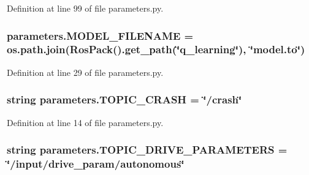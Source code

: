 Definition at line 99 of file parameters.\+py.

\subsubsection[{\texorpdfstring{M\+O\+D\+E\+L\+\_\+\+F\+I\+L\+E\+N\+A\+ME}{MODEL_FILENAME}}]{\setlength{\rightskip}{0pt plus 5cm}parameters.\+M\+O\+D\+E\+L\+\_\+\+F\+I\+L\+E\+N\+A\+ME = os.\+path.\+join(Ros\+Pack().get\+\_\+path(\char`\"{}q\+\_\+learning\char`\"{}), \char`\"{}model.\+to\char`\"{})}\hypertarget{namespaceparameters_aff8b0668384f3fa2d1212d3bd0ff42fa}{}\label{namespaceparameters_aff8b0668384f3fa2d1212d3bd0ff42fa}


Definition at line 29 of file parameters.\+py.

\subsubsection[{\texorpdfstring{T\+O\+P\+I\+C\+\_\+\+C\+R\+A\+SH}{TOPIC_CRASH}}]{\setlength{\rightskip}{0pt plus 5cm}string parameters.\+T\+O\+P\+I\+C\+\_\+\+C\+R\+A\+SH = \char`\"{}/crash\char`\"{}}\hypertarget{namespaceparameters_a5e392ed4d998f10824bfd96a0eae2988}{}\label{namespaceparameters_a5e392ed4d998f10824bfd96a0eae2988}


Definition at line 14 of file parameters.\+py.

\subsubsection[{\texorpdfstring{T\+O\+P\+I\+C\+\_\+\+D\+R\+I\+V\+E\+\_\+\+P\+A\+R\+A\+M\+E\+T\+E\+RS}{TOPIC_DRIVE_PARAMETERS}}]{\setlength{\rightskip}{0pt plus 5cm}string parameters.\+T\+O\+P\+I\+C\+\_\+\+D\+R\+I\+V\+E\+\_\+\+P\+A\+R\+A\+M\+E\+T\+E\+RS = \char`\"{}/input/drive\+\_\+param/autonomous\char`\"{}}\hypertarget{namespaceparameters_a855cb11de60782b8e9997af80bdab518}{}\label{namespaceparameters_a855cb11de60782b8e9997af80bdab518}


